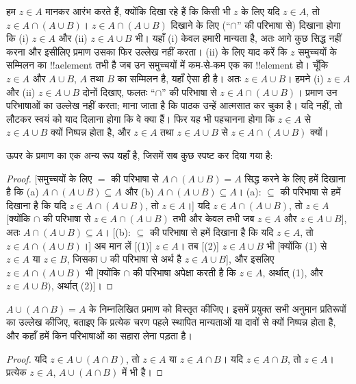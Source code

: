 \documentclass[../../../include/open-logic-section]{subfiles}
\begin{document}
हम $z\in A$ मानकर आरंभ करते हैं, क्योंकि दिखा रहे हैं कि किसी भी $z$ के
लिए यदि $z\in A$, तो $z\in A\cap(A\cup B)$। $z\in A\cap(A\cup B)$ दिखाने
के लिए (``$\cap$'' की परिभाषा से) दिखाना होगा कि (i) $z\in A$ और (ii)
$z\in A\cup B$ भी। यहाँ (i) केवल हमारी मान्यता है, अतः आगे कुछ सिद्ध नहीं
करना और इसीलिए प्रमाण उसका फिर उल्लेख नहीं करता। (ii) के लिए याद करें कि
$z$ समुच्चयों के सम्मिलन का !!a{element} तभी है जब उन समुच्चयों में
कम-से-कम एक का !!{element} हो। चूँकि $z\in A$ और $A\cup B$, $A$ तथा $B$
का सम्मिलन है, यहाँ ऐसा ही है। अतः $z\in A\cup B$। हमने (i) $z\in A$ और
(ii) $z\in A\cup B$ दोनों दिखाए, फलतः ``$\cap$'' की परिभाषा से
$z\in A\cap(A\cup B)$। प्रमाण उन परिभाषाओं का उल्लेख नहीं करता; माना जाता
है कि पाठक उन्हें आत्मसात कर चुका है। यदि नहीं, तो लौटकर स्वयं को याद दिलाना
होगा कि वे क्या हैं। फिर यह भी पहचानना होगा कि $z\in A$ से $z\in A\cup B$
क्यों निष्पन्न होता है, और $z\in A$ तथा $z\in A\cup B$ से
$z\in A\cap(A\cup B)$ क्यों।

ऊपर के प्रमाण का एक अन्य रूप यहाँ है, जिसमें सब कुछ स्पष्ट कर दिया गया है:
\begin{proof}{}
[समुच्चयों के लिए $=$ की परिभाषा से $A \cap (A \cup B) = A$ सिद्ध करने
  के लिए हमें दिखाना है कि (a) $A \cap (A \cup B) \subseteq A$ और (b)
  $A \cap (A \cup B) \subseteq A$। (a): $\subseteq$ की परिभाषा से हमें
  दिखाना है कि यदि $z \in A \cap (A \cup B)$, तो $z \in A$।] यदि $z
\in A \cap (A \cup B)$, तो $z \in A$ [क्योंकि $\cap$ की परिभाषा से
  $z \in A \cap (A \cup B)$ तभी और केवल तभी जब $z \in A$ और $z \in
  A \cup B$], अतः $A \cap (A \cup B) \subseteq A$। [(b): $\subseteq$
  की परिभाषा से हमें दिखाना है कि यदि $z \in A$, तो $z \in A \cap (A
  \cup B)$।] अब मान लें [(1)] $z \in A$। तब [(2)] $z \in A \cup B$
भी [क्योंकि (1) से $z \in A$ या $z \in B$, जिसका $\cup$ की परिभाषा से
  अर्थ है $z \in A \cup B$], और इसलिए $z \in A \cap (A \cup B)$ भी
[क्योंकि $\cap$ की परिभाषा अपेक्षा करती है कि $z \in A$, अर्थात् (1),
  और $z \in A \cup B)$, अर्थात् (2)]।
\end{proof}

\begin{prob}
$A \cup (A \cap B) = A$ के निम्नलिखित प्रमाण को विस्तृत कीजिए। इसमें
प्रयुक्त सभी अनुमान प्रतिरूपों का उल्लेख कीजिए, बताइए कि प्रत्येक चरण पहले
स्थापित मान्यताओं या दावों से क्यों निष्पन्न होता है, और कहाँ हमें किन
परिभाषाओं का सहारा लेना पड़ता है।
\begin{proof}
  यदि $z \in A \cup (A \cap B)$, तो $z \in A$ या $z \in A \cap B$।
  यदि $z \in A \cap B$, तो $z \in A$। प्रत्येक $z \in A$, $A \cup (A
  \cap B)$ में भी है।
\end{proof}
\end{prob}
\end{document}
